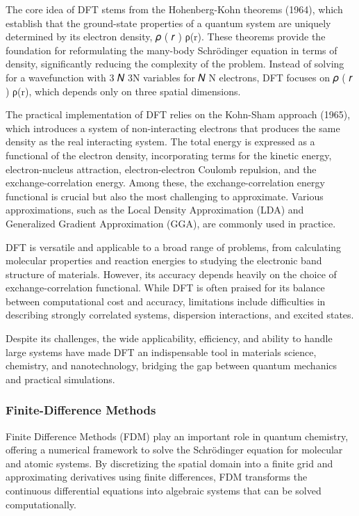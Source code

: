 The core idea of DFT stems from the Hohenberg-Kohn theorems (1964), which establish that the ground-state properties of a quantum system are uniquely determined by its electron density, 
𝜌
(
𝑟
)
ρ(r). These theorems provide the foundation for reformulating the many-body Schrödinger equation in terms of density, significantly reducing the complexity of the problem. Instead of solving for a wavefunction with 
3
𝑁
3N variables for 
𝑁
N electrons, DFT focuses on 
𝜌
(
𝑟
)
ρ(r), which depends only on three spatial dimensions.

The practical implementation of DFT relies on the Kohn-Sham approach (1965), which introduces a system of non-interacting electrons that produces the same density as the real interacting system. The total energy is expressed as a functional of the electron density, incorporating terms for the kinetic energy, electron-nucleus attraction, electron-electron Coulomb repulsion, and the exchange-correlation energy. Among these, the exchange-correlation energy functional is crucial but also the most challenging to approximate. Various approximations, such as the Local Density Approximation (LDA) and Generalized Gradient Approximation (GGA), are commonly used in practice.

DFT is versatile and applicable to a broad range of problems, from calculating molecular properties and reaction energies to studying the electronic band structure of materials. However, its accuracy depends heavily on the choice of exchange-correlation functional. While DFT is often praised for its balance between computational cost and accuracy, limitations include difficulties in describing strongly correlated systems, dispersion interactions, and excited states.

Despite its challenges, the wide applicability, efficiency, and ability to handle large systems have made DFT an indispensable tool in materials science, chemistry, and nanotechnology, bridging the gap between quantum mechanics and practical simulations.



\subsubsection{Finite-Difference Methods}
Finite Difference Methods (FDM) play an important role in quantum chemistry, offering a numerical framework to solve the Schrödinger equation for molecular and atomic systems. By discretizing the spatial domain into a finite grid and approximating derivatives using finite differences, FDM transforms the continuous differential equations into algebraic systems that can be solved computationally.

